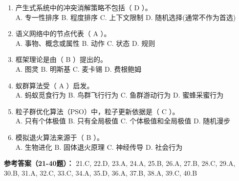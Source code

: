 \begin{enumerate}[resume,leftmargin=2em,itemsep=1pt]
\\ A. 知识获取 B. 推理机设计 C. 数据库构建 D. 用户界面
\item 产生式系统中的冲突消解策略不包括（ D ）。
\\ A. 专一性排序 B. 程度排序 C. 上下文限制 D. 随机选择(通常不作为首选)
\item 语义网络中的节点代表（ A ）。
\\ A. 事物、概念或属性 B. 动作 C. 状态 D. 规则
\item 框架理论是由（ B ）提出的。
\\ A. 图灵 B. 明斯基 C. 麦卡锡 D. 费根鲍姆
\item 蚁群算法受（ A ）启发。
\\ A. 蚂蚁觅食行为 B. 鸟群飞行行为 C. 鱼群游动行为 D. 蜜蜂采蜜行为
\item 粒子群优化算法（PSO）中，粒子更新依据是（ C ）。
\\ A. 只有个体极值 B. 只有全局极值 C. 个体极值和全局极值 D. 随机漫步
\item 模拟退火算法来源于（ B ）。
\\ A. 生物进化 B. 固体退火原理 C. 神经传导 D. 社会行为
\end{enumerate}

\textbf{参考答案（21-40题）：}
21.C, 22.D, 23.A, 24.A, 25.B, 26.A, 27.B, 28.C, 29.A, 30.B, 
31.A, 32.C, 33.C, 34.A, 35.D, 36.A, 37.B, 38.A, 39.C, 40.B

